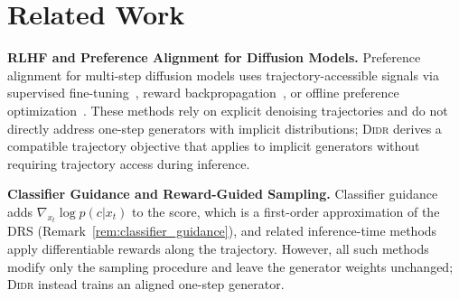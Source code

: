 \section{Related Work}
\vspace{-3mm}
\textbf{RLHF and Preference Alignment for Diffusion Models.}
Preference alignment for multi-step diffusion models uses trajectory-accessible signals via supervised fine-tuning~\citep{dai2023emu,podell2023sdxl}, reward backpropagation~\citep{prabhudesai2023aligning,clark2023directly,black2023training,fan2024reinforcement}, or offline preference optimization~\citep{wallace2024diffusion,yang2024using,hong2024margin}. These methods rely on explicit denoising trajectories and do not directly address one-step generators with implicit distributions; \textsc{Didr} derives a compatible trajectory objective that applies to implicit generators without requiring trajectory access during inference.

\textbf{Classifier Guidance and Reward-Guided Sampling.}
Classifier guidance~\citep{dhariwal2021diffusion} adds $\nabla_{x_t}\log p(c|x_t)$ to the score, which is a first-order approximation of the DRS (Remark~\ref{rem:classifier_guidance}), and related inference-time methods~\citep{chung2022diffusion,prabhudesai2023aligning,clark2023directly,kong2026ultra} apply differentiable rewards along the trajectory. However, all such methods modify only the sampling procedure and leave the generator weights unchanged; \textsc{Didr} instead trains an aligned one-step generator.

\vspace{-3mm}
